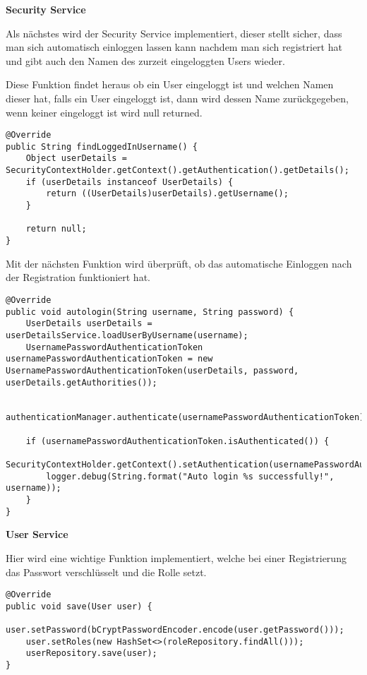 \item \textbf{Security Service}

Als nächstes wird der Security Service implementiert, dieser stellt sicher, dass man sich automatisch einloggen lassen kann nachdem man sich registriert hat und gibt auch den Namen des zurzeit eingeloggten Users wieder.

Diese Funktion findet heraus ob ein User eingeloggt ist und welchen Namen dieser hat, falls ein User eingeloggt ist, dann wird dessen Name zurückgegeben, wenn keiner eingeloggt ist wird null returned.
\begin{lstlisting}[style=Java]
@Override
public String findLoggedInUsername() {
	Object userDetails = SecurityContextHolder.getContext().getAuthentication().getDetails();
	if (userDetails instanceof UserDetails) {
		return ((UserDetails)userDetails).getUsername();
	}

	return null;
}
\end{lstlisting}

\clearpage

Mit der nächsten Funktion wird überprüft, ob das automatische Einloggen nach der Registration funktioniert hat.

\begin{lstlisting}[style=Java]
@Override
public void autologin(String username, String password) {
	UserDetails userDetails = userDetailsService.loadUserByUsername(username);
	UsernamePasswordAuthenticationToken usernamePasswordAuthenticationToken = new UsernamePasswordAuthenticationToken(userDetails, password, userDetails.getAuthorities());

	authenticationManager.authenticate(usernamePasswordAuthenticationToken);

	if (usernamePasswordAuthenticationToken.isAuthenticated()) {
		SecurityContextHolder.getContext().setAuthentication(usernamePasswordAuthenticationToken);
		logger.debug(String.format("Auto login %s successfully!", username));
	}
}
\end{lstlisting}

\item \textbf{User Service}

Hier wird eine wichtige Funktion implementiert, welche bei einer Registrierung das Passwort verschlüsselt und die Rolle setzt.

\begin{lstlisting}[style=Java]
@Override
public void save(User user) {
	user.setPassword(bCryptPasswordEncoder.encode(user.getPassword()));
	user.setRoles(new HashSet<>(roleRepository.findAll()));
	userRepository.save(user);
}
\end{lstlisting}

